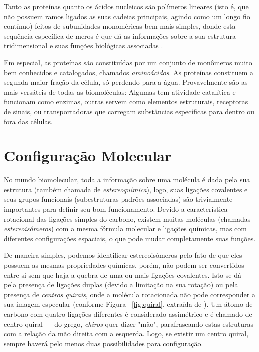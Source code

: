 Tanto as proteínas quanto os ácidos nucleicos são polímeros lineares (isto é, que não possuem ramos ligados as suas cadeias principais, agindo como um longo fio contínuo) feitos de subunidades monoméricas bem mais simples, donde esta sequência específica de meros é que dá as informações sobre a sua estrutura tridimensional e suas funções biológicas associadas \cite{bioquimicaLehninger}.

Em especial, as proteínas são constituídas por um conjunto de monômeros muito bem conhecidos e catalogados, chamados \textit{aminoácidos}. As proteínas constituem a segunda maior fração da célula, só perdendo para a água. Provavelmente são as mais versáteis de todas as biomoléculas: Algumas tem atividade catalítica e funcionam como enzimas, outras servem como elementos estruturais, receptoras de sinais, ou transportadoras que carregam substâncias específicas para dentro ou fora das células.  

\section*{Configuração Molecular}
No mundo biomolecular, toda a informação sobre uma molécula é dada pela sua estrutura (também chamada de \textit{estereoquímica}), logo, suas ligações covalentes e seus grupos funcionais (subestruturas padrões associadas) são trivialmente importantes para definir seu bom funcionamento. Devido a característica rotacional das ligações simples do carbono, existem muitas moléculas (chamadas \textit{estereoisômeros}) com a mesma fórmula molecular e ligações químicas, mas com diferentes configurações espaciais, o que pode mudar completamente suas funções. 

De maneira simples, podemos identificar estereoisômeros pelo fato de que eles possuem as mesmas propriedades químicas, porém, não podem ser convertidos entre si sem que haja a quebra de uma ou mais ligações covalentes. Isto se dá pela presença de ligações duplas (devido a limitação na sua rotação) ou pela presença de \textit{centros quirais}, onde a molécula rotacionada não pode corresponder a sua imagem especular (conforme Figura ~\ref{fig:quiral}, extraída de \cite{bioquimicaLehninger}). Um átomo de carbono com quatro ligações diferentes é considerado assimétrico e é chamado de centro quiral --- do grego, \textit{chiros} quer dizer "mão", parafraseando estas estruturas com a relação da mão direita com a esquerda. Logo, se existir um centro quiral, sempre haverá pelo menos duas possibilidades para configuração.

